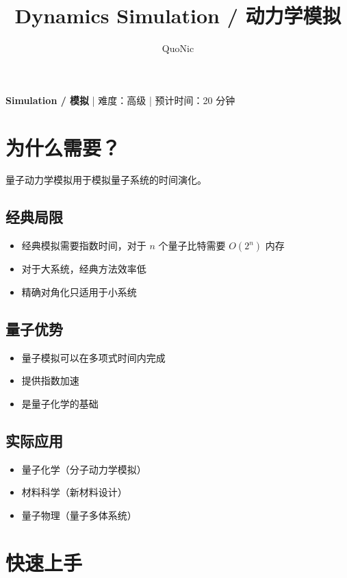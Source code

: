 \documentclass[12pt,a4paper]{article}
\title{Dynamics Simulation / 动力学模拟}
\author{QuoNic}
\date{}
\begin{document}
\maketitle

\begin{center}
\textbf{Simulation / 模拟} | 难度：高级 | 预计时间：20 分钟
\end{center}

\tableofcontents
\newpage

\section{为什么需要？}

量子动力学模拟用于模拟量子系统的时间演化。

\subsection{经典局限}
\begin{itemize}
  \item 经典模拟需要指数时间，对于 $n$ 个量子比特需要 $O(2^n)$ 内存
  \item 对于大系统，经典方法效率低
  \item 精确对角化只适用于小系统
\end{itemize}

\subsection{量子优势}
\begin{itemize}
  \item 量子模拟可以在多项式时间内完成
  \item 提供指数加速
  \item 是量子化学的基础
\end{itemize}

\subsection{实际应用}
\begin{itemize}
  \item 量子化学（分子动力学模拟）
  \item 材料科学（新材料设计）
  \item 量子物理（量子多体系统）
\end{itemize}

\section{快速上手}
\end{document}
